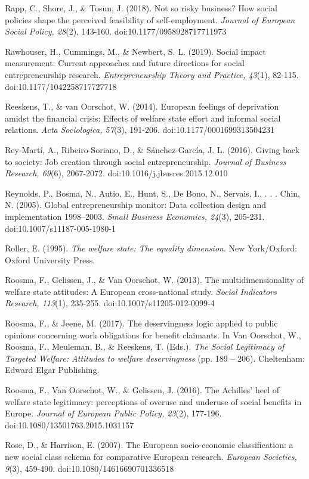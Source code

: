\documentclass{article}
\begin{document}
Rapp, C., Shore, J., \& Tosun, J. (2018). Not so risky business? How social policies shape the perceived feasibility of self-employment. \emph{Journal of European Social Policy, 28}(2), 143-160. doi:10.1177/0958928717711973

Rawhouser, H., Cummings, M., \& Newbert, S. L. (2019). Social impact measurement: Current approaches and future directions for social entrepreneurship research. \emph{Entrepreneurship Theory and Practice, 43}(1), 82-115. doi:10.1177/1042258717727718

Reeskens, T., \& van Oorschot, W. (2014). European feelings of deprivation amidst the financial crisis: Effects of welfare state effort and informal social relations. \emph{Acta }\emph{Sociologica}\emph{, 57}(3), 191-206. doi:10.1177/0001699313504231

Rey-Martí, A., Ribeiro-Soriano, D., \& Sánchez-García, J. L. (2016). Giving back to society: Job creation through social entrepreneurship. \emph{Journal of Business Research, 69}(6), 2067-2072. doi:10.1016/j.jbusres.2015.12.010

Reynolds, P., Bosma, N., Autio, E., Hunt, S., De Bono, N., Servais, I., . . . Chin, N. (2005). Global entrepreneurship monitor: Data collection design and implementation 1998--2003. \emph{Small Business Economics, 24}(3), 205-231. doi:10.1007/s11187-005-1980-1

Roller, E. (1995). \emph{The welfare state: The equality dimension}. New York/Oxford: Oxford University Press.

Roosma, F., Gelissen, J., \& Van Oorschot, W. (2013). The multidimensionality of welfare state attitudes: A European cross-national study. \emph{Social Indicators Research, 113}(1), 235-255. doi:10.1007/s11205-012-0099-4

Roosma, F., \& Jeene, M. (2017). The deservingness logic applied to public opinions concerning work obligations for benefit claimants. In Van Oorschot, W., Roosma, F., Meuleman, B., \& Reeskens, T. (Eds.). \emph{The Social Legitimacy of Targeted Welfare: Attitudes to welfare deservingness} (pp. 189 -- 206). Cheltenham: Edward Elgar Publishing.

Roosma, F., Van Oorschot, W., \& Gelissen, J. (2016). The Achilles' heel of welfare state legitimacy: perceptions of overuse and underuse of social benefits in Europe. \emph{Journal of European Public Policy, 23}(2), 177-196. doi:10.1080/13501763.2015.1031157

Rose, D., \& Harrison, E. (2007). The European socio-economic classification: a new social class schema for comparative European research. \emph{European Societies, 9}(3), 459-490. doi:10.1080/14616690701336518
\end{document}
